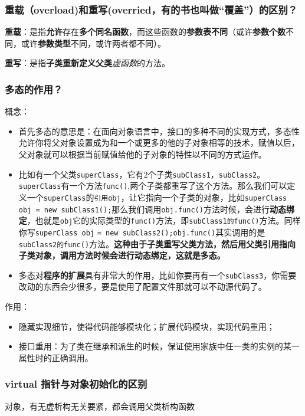 \documentclass[UTF8,a4paper,8pt]{ctexart}
\begin{document}
		\subsubsection{重载（overload)和重写(overried，有的书也叫做“覆盖”）的区别？}
			\textbf{重载}：是指\textbf{允许}存在\textbf{多个同名函数}，而这些函数的\textbf{参数表不同}（或许\textbf{参数个数}不同，或许\textbf{参数类型}不同，或许两者都不同）。
			
			\textbf{重写}：是指\textbf{子类重新定义父类}\textit{虚函数}的方法。
		\subsubsection{多态的作用？}
			概念：
			\begin{itemize}[itemindent = 1em]
				\item 首先多态的意思是：在面向对象语言中，接口的多种不同的实现方式，多态性允许你将父对象设置成为和一个或更多的他的子对象相等的技术，赋值以后，父对象就可以根据当前赋值给他的子对象的特性以不同的方式运作。
				
				\item 比如有一个父类\verb|superClass|，它有2个子类\verb|subClass1|，\verb|subClass2|。\verb|superClass|有一个方法\verb|func()|,两个子类都重写了这个方法。那么我们可以定义一个\verb|superClass|的\verb|引用obj|，让它指向一个子类的对象，比如\verb|superClass| \verb|obj = new subClass1();|那么我们调用\verb|obj.func()|方法时候，会进行\textbf{动态绑定}，也就是\verb|obj|它的实际类型的\verb|func()|方法，即\verb|subClass1的func()|方法。同样你写\verb|superClass obj| \verb|= new subClass2();|\verb|obj.func()|其实调用的是\verb|subClass2的func()|方法。\textbf{这种由于子类重写父类方法，然后用父类引用指向子类对象，调用方法时候会进行动态绑定，这就是多态。}
				
				\item 多态对\textbf{程序的扩展}具有非常大的作用，比如你要再有一个\verb|subClass3|，你需要改动的东西会少很多，要是使用了配置文件那就可以不动源代码了。
			\end{itemize}
			
			作用：
			\begin{itemize}[itemindent = 1em]
				\item  隐藏实现细节，使得代码能够模块化；扩展代码模块，实现代码重用；
				\item  接口重用：为了类在继承和派生的时候，保证使用家族中任一类的实例的某一属性时的正确调用。
			\end{itemize}
		
		\subsubsection{virtual 指针与对象初始化的区别}
			对象，有无虚析构无关要紧，都会调用父类析构函数
			
\end{document}
